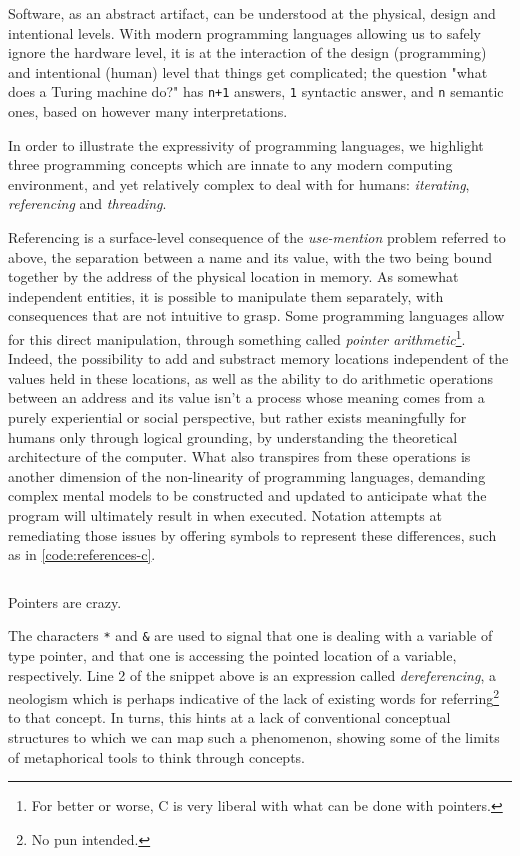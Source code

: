 Software, as an abstract artifact, can be understood at the physical, design and intentional levels\citep{moor_three_1978}. With modern programming languages allowing us to safely ignore the hardware level, it is at the interaction of the design (programming) and intentional (human) level that things get complicated; the question "what does a Turing machine do?" has \lstinline{n+1} answers, \lstinline{1} syntactic answer, and \lstinline{n} semantic ones, based on however many interpretations.

In order to illustrate the expressivity of programming languages, we highlight three programming concepts which are innate to any modern computing environment, and yet relatively complex to deal with for humans: \emph{iterating}, \emph{referencing} and \emph{threading}.

Referencing is a surface-level consequence of the \emph{use-mention} problem referred to above, the separation between a name and its value, with the two being bound together by the address of the physical location in memory. As somewhat independent entities, it is possible to manipulate them separately, with consequences that are not intuitive to grasp. Some programming languages allow for this direct manipulation, through something called \emph{pointer arithmetic}\footnote{For better or worse, C is very liberal with what can be done with pointers.}. Indeed, the possibility to add and substract memory locations independent of the values held in these locations, as well as the ability to do arithmetic operations between an address and its value isn't a process whose meaning comes from a purely experiential or social perspective, but rather exists meaningfully for humans only through logical grounding, by understanding the theoretical architecture of the computer. What also transpires from these operations is another dimension of the non-linearity of programming languages, demanding complex mental models to be constructed and updated to anticipate what the program will ultimately result in when executed. Notation attempts at remediating those issues by offering symbols to represent these differences, such as in \ref{code:references-c}.

\begin{listing}
  \inputminted{c}{./corpus/references.c}
  \caption{Pointers are crazy.}
  \label{code:references-c}
\end{listing}

The characters \lstinline{*} and \lstinline{&} are used to signal that one is dealing with a variable of type pointer, and that one is accessing the pointed location of a variable, respectively. Line 2 of the snippet above is an expression called \emph{dereferencing}, a neologism which is perhaps indicative of the lack of existing words for referring\footnote{No pun intended.} to that concept. In turns, this hints at a lack of conventional conceptual structures to which we can map such a phenomenon, showing some of the limits of metaphorical tools to think through concepts.

